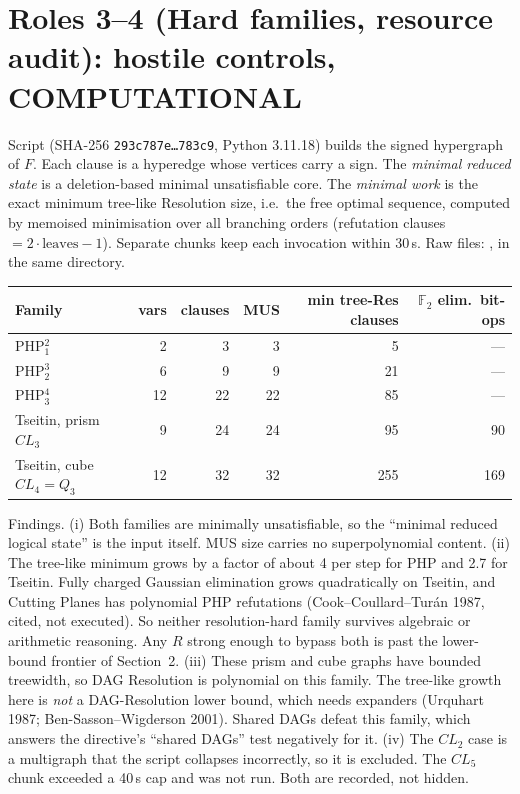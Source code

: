 \documentclass[11pt]{article}
\begin{document}
\section{Roles 3--4 (Hard families, resource audit): hostile controls, COMPUTATIONAL}
Script 
(SHA-256 \texttt{293c787e\ldots 783c9}, Python 3.11.18) builds the signed
hypergraph of $F$. Each clause is a hyperedge whose vertices carry a sign.
The \emph{minimal reduced state} is a deletion-based minimal unsatisfiable core.
The \emph{minimal work} is the exact minimum tree-like Resolution size, i.e.\
the free optimal sequence, computed by memoised minimisation over all branching
orders (refutation clauses $=2\cdot\text{leaves}-1$). Separate chunks keep each
invocation within 30\,s.
Raw files: ,  in the same directory.

\begin{longtable}{lrrrrr}
\toprule
Family & vars & clauses & MUS & min tree-Res clauses & $\mathbb F_2$ elim.\ bit-ops\\
\midrule
PHP$^{2}_{1}$ & 2 & 3 & 3 & 5 & ---\\
PHP$^{3}_{2}$ & 6 & 9 & 9 & 21 & ---\\
PHP$^{4}_{3}$ & 12 & 22 & 22 & 85 & ---\\
Tseitin, prism $CL_3$ & 9 & 24 & 24 & 95 & 90\\
Tseitin, cube $CL_4=Q_3$ & 12 & 32 & 32 & 255 & 169\\
\bottomrule
\end{longtable}
Findings. (i) Both families are minimally unsatisfiable, so the ``minimal
reduced logical state'' is the input itself. MUS size carries no
superpolynomial content. (ii) The tree-like minimum grows by a factor of about
4 per step for PHP and 2.7 for Tseitin. Fully charged Gaussian elimination
grows quadratically on Tseitin, and Cutting Planes has polynomial PHP
refutations (Cook--Coullard--Turán 1987, cited, not executed). So neither
resolution-hard family survives algebraic or arithmetic reasoning. Any $R$
strong enough to bypass both is past the lower-bound frontier of Section~2.
(iii) These prism and cube graphs have bounded treewidth, so DAG Resolution is
polynomial on this family. The tree-like growth here is \emph{not} a DAG-Resolution
lower bound, which needs expanders (Urquhart 1987; Ben-Sasson--Wigderson 2001).
Shared DAGs defeat this family, which answers the directive's ``shared DAGs''
test negatively for it. (iv) The $CL_2$ case is a multigraph that the script
collapses incorrectly, so it is excluded. The $CL_5$ chunk exceeded a 40\,s cap
and was not run. Both are recorded, not hidden.
\end{document}
